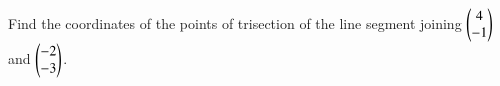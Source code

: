 \begin{flushleft}
Find the coordinates of the points of trisection of the line segment joining 
$\begin{pmatrix}4\\-1\end{pmatrix}$ and $\begin{pmatrix}-2\\-3\end{pmatrix}$.
\end{flushleft}

